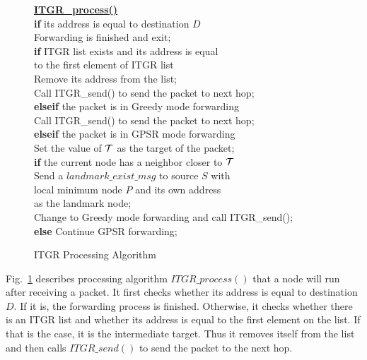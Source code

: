 \documentclass[3p,times]{elsarticle}
\begin{document}
\begin{figure}[hbt]
\baselineskip=10.2pt

{\small
  \noindent\underline{\bf ITGR\_process()} \\
  \text{~~~~}\textbf{if} its address is equal to destination $D$ \\
  \text{~~~~~~~~}Forwarding is finished and exit;\\
  \text{~~~~}\textbf{if} ITGR list exists and its address is equal \\
  \text{~~~~~~~~~~~~}to the first element of ITGR list \\
  \text{~~~~~~~~}Remove its address from the list; \\
  \text{~~~~~~~~}Call ITGR\_send() to send the packet to next hop; \\
  \text{~~~~}\textbf{elseif} the packet is in Greedy mode forwarding \\
  \text{~~~~~~~~}Call ITGR\_send() to send the packet to next hop; \\
  \text{~~~~}\textbf{elseif} the packet is in GPSR mode forwarding \\
  \text{~~~~~~~~}Set the value of ${\cal T}$ as the target of the packet;\\
  \text{~~~~~~~~}\textbf{if} the current node has a neighbor closer to ${\cal T}$\\
  \text{~~~~~~~~~~~~}Send a $landmark\_exist\_msg$ to source $S$ with \\
  \text{~~~~~~~~~~~~~~~~}local minimum node $P$ and its own address \\
  \text{~~~~~~~~~~~~~~~~}as the landmark node; \\
  \text{~~~~~~~~~~~~}Change to Greedy mode forwarding and call ITGR\_send(); \\
  \text{~~~~~~~~}\textbf{else} Continue GPSR forwarding; \\
}

\protect\caption{ITGR Processing Algorithm}
\protect\label{receivingfig}
\end{figure}


Fig.~\ref{receivingfig} describes processing algorithm $ITGR\_process()$
that a node will run after receiving a packet.
It first checks whether its address is equal to
destination $D$. If it is, the forwarding process is finished.
Otherwise, it checks whether there is an ITGR list and whether
its address is equal to the first element on the list.
If that is the case, it is the intermediate target.
Thus it removes itself from the list
and then calls $ITGR\_send()$ to send the packet to the next hop.
\end{document}
